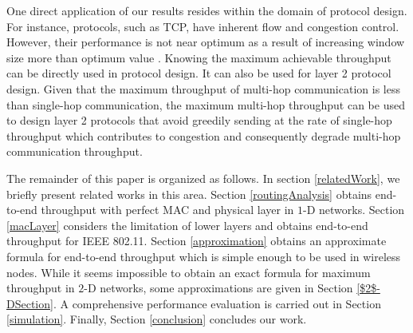 \documentclass[12pt, draftclsnofoot, onecolumn]{IEEEtran}
\begin{document}
One direct application of our results resides within the domain of protocol design. For instance, protocols, such as TCP, have inherent flow and congestion control. However, their performance is not near optimum as a result of increasing window size more than optimum value \cite{ref21}. Knowing the maximum achievable throughput can be directly used in protocol design. It can also be used for layer 2 protocol design. Given that the maximum throughput of multi-hop communication is less than single-hop communication, the maximum multi-hop throughput can be used to design layer 2 protocols that avoid greedily sending at the rate of single-hop throughput which contributes to congestion and consequently degrade multi-hop communication throughput.

The remainder of this paper is organized as follows. In section \ref{relatedWork}, 
we briefly present related works in this area. Section \ref{routingAnalysis} obtains 
end-to-end throughput with perfect MAC and physical layer in $1$-D networks. Section \ref{macLayer} 
considers the limitation of lower layers and obtains end-to-end throughput for IEEE 
802.11. Section \ref{approximation} obtains an approximate formula for end-to-end 
throughput which is simple enough to be used in wireless nodes. While it seems 
impossible to obtain an exact formula for maximum throughput in $2$-D networks, 
some approximations are given in Section \ref{$2$-DSection}. A comprehensive 
performance evaluation is carried out in Section \ref{simulation}. Finally, Section 
\ref{conclusion} concludes our work.





\end{document}

